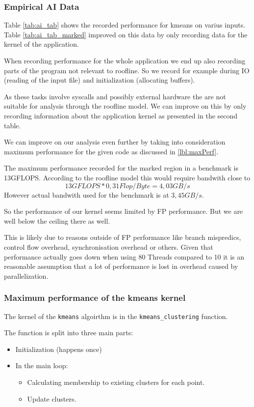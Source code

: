 \subsubsection{Empirical AI Data}

Table \ref{tab:ai_tab} shows the recorded performance for kmeans on varius inputs.
Table \ref{tab:ai_tab_marked} improved on this data by only recording data for the kernel of the application.

When recording performance for the whole application we end up also recording parts of the program not relevant to roofline.
So we record for example during IO (reading of the input file) and initialization (allocating buffers).

As these tasks involve syscalls and possibly external hardware the are not suitable for analysis through the roofline model.
We can improve on this by only recording information about the application kernel as presented in the second table.

We can improve on our analysis even further by taking into consideration
maximum performance for the given code as discussed in \autoref{lbl:maxPerf}.

The maximum performance recorded for the marked region in a benchmark is 13GFLOPS.
According to the roofline model this would require bandwith close to $$13 GFLOPS * 0,31 Flop/Byte = 4,03 GB/s$$
However actual bandwith used for the benchmark is at $3,45 GB/s$.

So the performance of our kernel seems limited by FP performance. But we are well below the ceiling there as well.

This is likely due to reasons outside of FP performance 
like branch mispredics, control flow overhead, synchronisation overhead or others. Given that performance actually goes
down when using 80 Threads compared to 10 it is an reasonable assumption that a lot of performance is lost in overhead
caused by parallelization.


\subsubsection{Maximum performance of the kmeans kernel}
\label{lbl:maxPerf}

The kernel of the \texttt{kmeans} algoirthm is in the \texttt{kmeans\_clustering} function.

The function is split into three main parts:
\begin{itemize}
	\item Initialization (happens once)
	\item In the main loop:
	\begin{itemize}
		\item Calculating membership to existing clusters for each point.
		\item Update clusters.
	\end{itemize}
\end{itemize}

